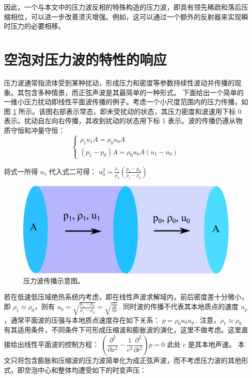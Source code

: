 因此，一个与本文中的压力波反相的特殊构造的压力波，即具有领先稀疏和落后压缩相位，可以进一步改善溃灭增强。例如，这可以通过一个额外的反射器来实现瞬时压力的必要相移。



\section{空泡对压力波的特性的响应}

压力波通常指流体受到某种扰动，形成压力和密度等参数持续性波动并传播的现象。其包含多种情景，而正弦声波是其最简单的一种形式。
下面给出一个简单的一维小压力扰动即线性平面波传播的例子。考虑一个小尺度范围内的压力传播，如图
\ref{fig:5.19} 所示。该图右部表示常态，即未受扰动的状态，其压力密度和波速用下标 0
表示。扰动自左向右传播，其收到扰动的状态用下标 1
表示。波的传播仍遵从物质守恒和冲量守恒： $$
\left\{\begin{array}{lr}
\rho_1 u_1 A=\rho_0 u_0 A \\
(p_1-p_0)A=\rho_0 u_0 A(u_1-u_0)
\end{array}
\right.
$$

将式一所得 $u_1$ 代入式二可得： $
u_0^2=\frac {\rho_1} {\rho_0}(\frac{p_1-p_0}{\rho_1-\rho_0})
$

\begin{figure}[H]
  \centering
  \includegraphics[width=0.5\linewidth]{img/fig5.19-eps-converted-to.pdf}
  \caption[压力波传播示意图]{压力波传播示意图。}
  \label{fig:5.19}
\end{figure}


若在低速低压域绝热系统内考虑，即在线性声波求解域内，前后密度差十分微小，即
$\rho_1 \approx \rho_0$，则有
$u_0=\sqrt {\frac {p_1-p_0}{\rho_1-\rho_0} }=\sqrt {\frac{\mathrm{d}p }{\mathrm{d}\rho}}\,.$
同时波的传播不代表其本地质点的速度
$u_\mathrm p$，通常平面波的压强与本地质点速度存在如下关系：
$p=\rho_0 u_0 u_\mathrm p\,.$ 注意，$\rho_1 \approx \rho_0$
有其适用条件，不同条件下可形成压缩波和膨胀波的演化，这里不做考虑。这里直接给出线性平面波的控制方程：
$
(\dfrac{\partial^2 }{\partial x^2}-\dfrac{1}{c^2}\dfrac{\partial^2 }{\partial t^2} )p =0
$ 此处 $c$ 是其本地声速。
本文只将包含膨胀和压缩波的压力波简单化为成正弦声波，而不考虑压力波的其他形式，即空泡中心和整体均遭受如下的时变声压：

